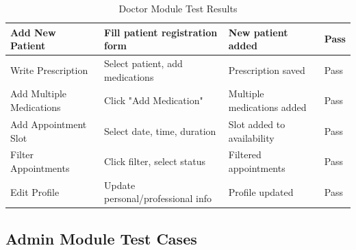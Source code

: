 \begin{table}[H]
\begin{tabular}{|p{2.5cm}|p{3.8cm}|p{2.2cm}|p{1.2cm}|}
        \hline
        Add New Patient & Fill patient registration form & New patient added & Pass \\
        \hline
        Write Prescription & Select patient, add medications & Prescription saved & Pass \\
        \hline
        Add Multiple Medications & Click "Add Medication" & Multiple medications added & Pass \\
        \hline
        Add Appointment Slot & Select date, time, duration & Slot added to availability & Pass \\
        \hline
        Filter Appointments & Click filter, select status & Filtered appointments & Pass \\
        \hline
        Edit Profile & Update personal/professional info & Profile updated & Pass \\
        \hline
    \end{tabular}
    \caption{Doctor Module Test Results}
    \label{tab:doctor-tests}
\end{table}

\subsection{Admin Module Test Cases}

